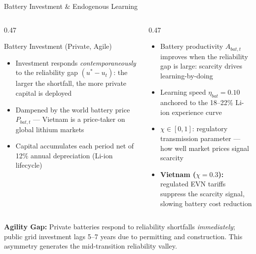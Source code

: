 \documentclass[aspectratio=169,10pt]{beamer}
\newcommand{\fuvhl}[1]{\textcolor{fuvteal}{\textbf{#1}}}
\newcommand{\fuvwarn}[1]{\textcolor{fuvred}{\textbf{#1}}}
\begin{document}
\begin{frame}{Battery Investment \& Endogenous Learning}
  \begin{columns}[T]
    \begin{column}{0.47\textwidth}
      \begin{block}{Battery Investment (Private, Agile)}
        \begin{itemize}\small
          \item Investment responds \textit{contemporaneously} to the reliability gap $(u^* - u_t)$: the larger the shortfall, the more private capital is deployed
          \item Dampened by the world battery price $P_{bat,t}$ --- Vietnam is a price-taker on global lithium markets
          \item Capital accumulates each period net of 12\% annual depreciation (Li-ion lifecycle)
        \end{itemize}
      \end{block}
    \end{column}
    \begin{column}{0.47\textwidth}
      \begin{alertbox}[title=\textbf{Contribution 3} --- Endogenous Learning]
        \begin{itemize}\small
          \item Battery productivity $A_{bat,t}$ improves when the reliability gap is large: scarcity drives learning-by-doing
          \item Learning speed $\eta_{bat} = 0.10$ anchored to the 18--22\% Li-ion experience curve
          \item \fuvhl{$\chi \in [0,1]$}: regulatory transmission parameter — how well market prices signal scarcity
          \item \fuvwarn{Vietnam ($\chi = 0.3$):} regulated EVN tariffs suppress the scarcity signal, slowing battery cost reduction
        \end{itemize}
      \end{alertbox}
    \end{column}
  \end{columns}
  \vspace{0.2em}
  \begin{goldbox}
    \small \textbf{Agility Gap:} Private batteries respond to reliability shortfalls \textit{immediately}; public grid investment lags 5--7 years due to permitting and construction. This asymmetry generates the mid-transition reliability valley.
  \end{goldbox}
\end{frame}
\end{document}
